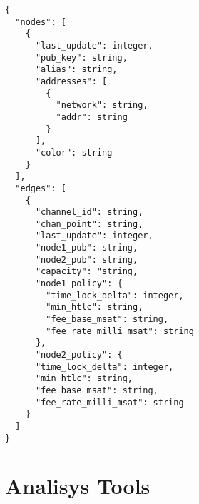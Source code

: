	\singlespacing
	\begin{lstlisting}
{
  "nodes": [
    {
      "last_update": integer,
      "pub_key": string,
      "alias": string,
      "addresses": [
        {
          "network": string,
          "addr": string
        }
      ],
      "color": string
    }
  ],
  "edges": [
    {
      "channel_id": string,
      "chan_point": string,
      "last_update": integer,
      "node1_pub": string,
      "node2_pub": string,
      "capacity": "string,
      "node1_policy": {
        "time_lock_delta": integer,
        "min_htlc": string,
        "fee_base_msat": string,
        "fee_rate_milli_msat": string
      },
      "node2_policy": {
      "time_lock_delta": integer,
      "min_htlc": string,
      "fee_base_msat": string,
      "fee_rate_milli_msat": string
    }
  ]
}
	\end{lstlisting}
	\onehalfspacing
		
	\section{Analisys Tools}
		
